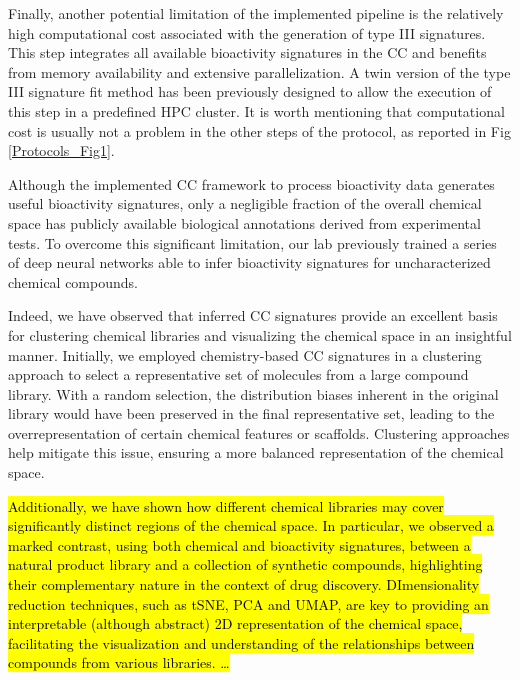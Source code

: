 Finally, another potential limitation of the implemented pipeline is the relatively high computational cost associated with the generation of type III signatures. This step integrates all available bioactivity signatures in the CC and benefits from memory availability and extensive parallelization. A twin version of the type III signature fit method has been previously designed to allow the execution of this step in a predefined HPC cluster. It is worth mentioning that computational cost is usually not a problem in the other steps of the protocol, as reported in Fig \ref{Protocols_Fig1}.  


Although the implemented CC framework to process bioactivity data generates useful bioactivity signatures, only a negligible fraction of the overall chemical space has publicly available biological annotations derived from experimental tests. To overcome this significant limitation, our lab previously trained a series of deep neural networks able to infer bioactivity signatures for uncharacterized chemical compounds. 

Indeed, we have observed that inferred CC signatures provide an excellent basis for clustering chemical libraries and visualizing the chemical space in an insightful manner. Initially, we employed chemistry-based CC signatures in a clustering approach to select a representative set of molecules from a large compound library. With a random selection, the distribution biases inherent in the original library would have been preserved in the final representative set, leading to the overrepresentation of certain chemical features or scaffolds. Clustering approaches help mitigate this issue, ensuring a more balanced representation of the chemical space. 

\hl{Additionally, we have shown how different chemical libraries may cover significantly distinct regions of the chemical space. In particular, we observed a marked contrast, using both chemical and bioactivity signatures, between a natural product library and a collection of synthetic compounds, highlighting their complementary nature in the context of drug discovery. DImensionality reduction techniques, such as tSNE, PCA and UMAP, are key to providing an interpretable (although abstract) 2D representation of the chemical space, facilitating the visualization and understanding of the relationships between compounds from various libraries. …  }

